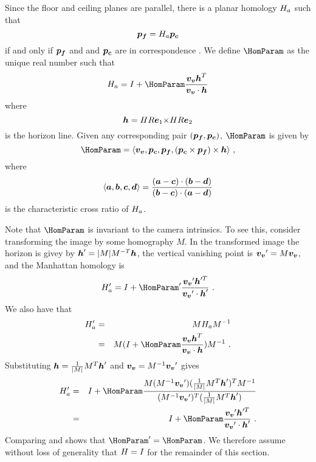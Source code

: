 Since the floor and ceiling planes are parallel, there is a planar
homology $\Hcf$ such that
\begin{equation}
  \FloorPt = \Hcf \CeilPt
\end{equation}
if and only if $\pfloor$ and and $\pceil$ are in correspondence
\cite{Criminisi01}. We define $\HomParam$ as the unique real number
such that
\begin{equation}
  \label{eq:manhattanhom}
  \Hcf = I + \HomParam\frac{\vvpt\horizon^T}{\vvpt \cdot \horizon}
\end{equation}
where
\begin{equation}
  \horizon = \CamMatrix\CamR\ex \cross \CamMatrix\CamR\ey
\end{equation}
is the horizon line. Given any corresponding pair
$(\FloorPt,\CeilPt)$, $\HomParam$ is given by \cite{Criminisi01}
\begin{equation}
  \HomParam = 
  \langle\vvpt,\CeilPt,\FloorPt,(\CeilPt\times\FloorPt)\times\horizon\rangle ~,
\end{equation}
where
\begin{equation}
  \langle \vect{a},\vect{b},\vect{c},\vect{d} \rangle = \frac{
    (\vect{a}-\vect{c}) \cdot (\vect{b}-\vect{d})
  }{
    (\vect{b}-\vect{c}) \cdot (\vect{a}-\vect{d})
  }
\end{equation}
is the characteristic cross ratio of $\Hcf$.

Note that $\HomParam$ is invariant to the camera intrinsics. To see
this, consider transforming the image by some homography $M$. In the
transformed image the horizon is givey by
$\horizon'=|M|M^{-T}\horizon$, the vertical vanishing point is
$\vvpt'=M\vvpt$, and the Manhattan homology is
\begin{equation}
  \label{eq:homprime}
  \Hcf' = I + \HomParam'\frac{\vvpt'\horizon'^T}{\vvpt'\cdot\horizon'}~.
\end{equation}
We also have that
\begin{eqnarray}
  \Hcf' &=& M \Hcf M^{-1} \\
  &=& M (I + \HomParam\frac{\vvpt\horizon^T}{\vvpt \cdot
    \horizon})M^{-1} ~.\\
\end{eqnarray}
Substituting $\horizon=\frac{1}{|M|}M^T\horizon'$ and
$\vvpt=M^{-1}\vvpt'$ gives
\begin{eqnarray}
  \Hcf' &=& I + \HomParam
    \frac{M(M^{-1}\vvpt')(\frac{1}{|M|}M^T\horizon')^T M^{-1}}
         {(M^{-1}\vvpt')^T(\frac{1}{|M|}M^T\horizon')}\\
  \label{eq:comparehom}
  &=& I + \HomParam\frac{\vvpt'\horizon'^T}
                        {\vvpt'\cdot\horizon'} ~.
\end{eqnarray}
Comparing  and  shows that
$\HomParam'=\HomParam$. We therefore assume without loss of generality
that $\CamMatrix=I$ for the remainder of this section.

